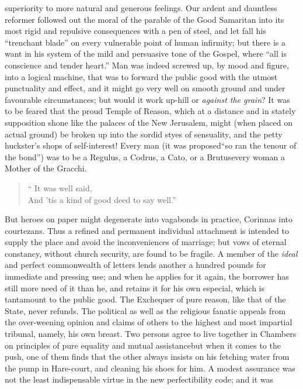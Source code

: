 superiority to more natural and generous feelings. Our ardent and
dauntless reformer followed out the moral of the parable of the
Good Samaritan into its most rigid and repulsive consequences with
a pen of steel, and let fall his ``trenchant blade'' on every
vulnerable point of human infirmity; but there is a want in his
system of the mild and persuasive tone of the Gospel, where ``all
is conscience and tender heart.'' Man was indeed screwed up, by
mood and figure, into a logical machine, that was to forward the
public good with the utmost punctuality and effect, and it might
go very well on smooth ground and under favourable circumstances;
but would it work up-hill or \emph{against the grain}? It was to
be feared that the proud Temple of Reason, which at a distance and
in stately supposition shone like the palaces of the New
Jerusalem, might (when placed on actual ground) be broken up into
the sordid styes of sensuality, and the petty huckster's shops of
self-interest! Every man (it was proposed\textemdash ``so ran the
tenour of the bond'') was to be a Regulus, a Codrus, a Cato, or a
Brutus\textemdash every woman a Mother of the Gracchi.
\begin{quotation} %
  `` It was well said,\\
  And 'tis a kind of good deed to say well.''
\end{quotation} But heroes on paper might degenerate into
vagabonds in practice, Corinnas into courtezans. Thus a refined
and permanent individual attachment is intended to supply the
place and avoid the inconveniences of marriage; but vows of
eternal constancy, without church security, are found to be
fragile. A member of the \emph{ideal} and perfect commonwealth of
letters lends another a hundred pounds for immediate and pressing
use; and when he applies for it again, the borrower has still more
need of it than he, and retains it for his own especial, which is
tantamount to the public good. The Exchequer of pure reason, like
that of the State, never refunds. The political as well as the
religious fanatic appeals from the over-weening opinion and claims
of others to the highest and most impartial tribunal, namely, his
own breast. Two persons agree to live together in Chambers on
principles of pure equality and mutual assistance\textemdash but
when it comes to the push, one of them finds that the other always
insists on his fetching water from the pump in Hare-court, and
cleaning his shoes for him. A modest assurance was not the least
indispensable virtue in the new perfectibility code; and it was
